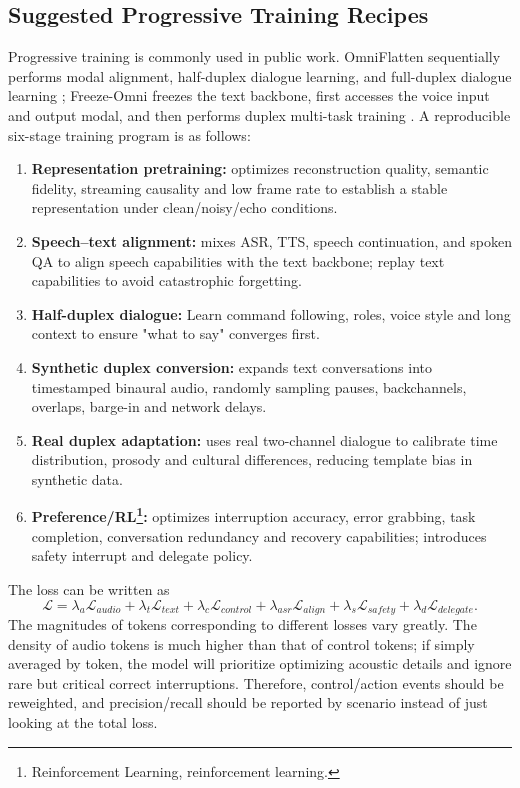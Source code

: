\documentclass[UTF8,fontset=none,a4paper,10pt]{ctexart}
\begin{document}
\subsection{Suggested Progressive Training Recipes}

Progressive training is commonly used in public work. OmniFlatten sequentially performs modal alignment, half-duplex dialogue learning, and full-duplex dialogue learning \cite{zhang2024omniflatten}; Freeze-Omni freezes the text backbone, first accesses the voice input and output modal, and then performs duplex multi-task training \cite{wang2024freezeomni}. A reproducible six-stage training program is as follows:

\begin{enumerate}
\item \textbf{Representation pretraining: } optimizes reconstruction quality, semantic fidelity, streaming causality and low frame rate to establish a stable representation under clean/noisy/echo conditions.
\item \textbf{Speech--text alignment: } mixes ASR, TTS, speech continuation, and spoken QA to align speech capabilities with the text backbone; replay text capabilities to avoid catastrophic forgetting.
\item \textbf{Half-duplex dialogue: } Learn command following, roles, voice style and long context to ensure "what to say" converges first.
\item \textbf{Synthetic duplex conversion: } expands text conversations into timestamped binaural audio, randomly sampling pauses, backchannels, overlaps, barge-in and network delays.
\item \textbf{Real duplex adaptation: } uses real two-channel dialogue to calibrate time distribution, prosody and cultural differences, reducing template bias in synthetic data.
\item \textbf{Preference/RL\footnote{Reinforcement Learning, reinforcement learning. }: } optimizes interruption accuracy, error grabbing, task completion, conversation redundancy and recovery capabilities; introduces safety interrupt and delegate policy.
\end{enumerate}

The loss can be written as
\begin{equation}
\mathcal L=\lambda_a\mathcal L_{audio}+\lambda_t\mathcal L_{text}+\lambda_c\mathcal L_{control}
+\lambda_{asr}\mathcal L_{align}+\lambda_s\mathcal L_{safety}+\lambda_d\mathcal L_{delegate}.
\end{equation}
The magnitudes of tokens corresponding to different losses vary greatly. The density of audio tokens is much higher than that of control tokens; if simply averaged by token, the model will prioritize optimizing acoustic details and ignore rare but critical correct interruptions. Therefore, control/action events should be reweighted, and precision/recall should be reported by scenario instead of just looking at the total loss.
\end{document}
